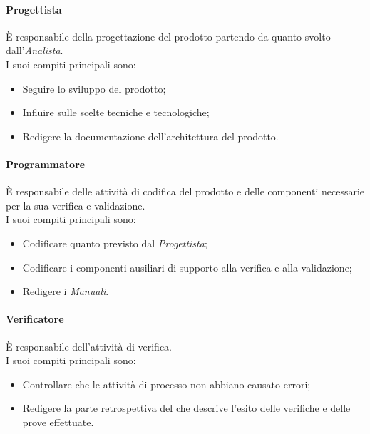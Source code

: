 \paragraph*{Progettista}
È responsabile della progettazione del prodotto partendo da quanto svolto dall'\textit{Analista}. \\
I suoi compiti principali sono:
\begin{itemize}
	\item Seguire lo sviluppo del prodotto;
	\item Influire sulle scelte tecniche e tecnologiche;
	\item Redigere la documentazione dell'architettura del prodotto.
\end{itemize}

\paragraph*{Programmatore}
È responsabile delle attività di codifica del prodotto e delle componenti necessarie per la sua verifica e validazione. \\
I suoi compiti principali sono:
\begin{itemize}
	\item Codificare quanto previsto dal \textit{Progettista};
	\item Codificare i componenti ausiliari di supporto alla verifica e alla validazione;
	\item Redigere i \textit{Manuali}.
\end{itemize}

\paragraph*{Verificatore}
È responsabile dell'attività di verifica. \\
I suoi compiti principali sono:
\begin{itemize}
	\item Controllare che le attività di processo non abbiano causato errori;
	\item Redigere la parte retrospettiva del \PdQv che descrive l'esito delle verifiche e delle prove effettuate.
\end{itemize}

